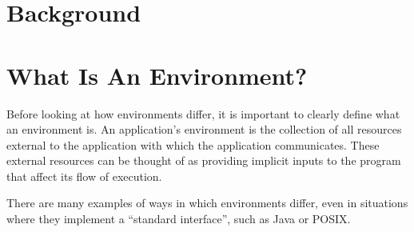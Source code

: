 \section{Background}
\label{SEC:background}

\section{What Is An Environment?}

Before looking at how environments differ, it is important to clearly
define what an environment is.  An application's environment is the
collection of all resources external to the application with which the
application communicates.  These external resources can be thought of as
providing implicit inputs to the program that affect its flow of execution.

There are many examples of ways in which environments differ, even in
situations where they implement a ``standard interface'', such as Java or
POSIX.

